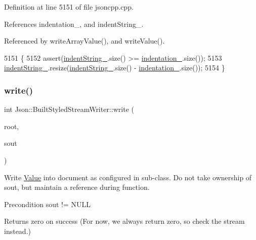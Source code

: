 Definition at line 5151 of file jsoncpp.\+cpp.



References indentation\+\_\+, and indent\+String\+\_\+.



Referenced by write\+Array\+Value(), and write\+Value().


\begin{DoxyCode}
5151                                        \{
5152   assert(\hyperlink{struct_json_1_1_built_styled_stream_writer_a0f8115a4fb474ab0e9de25f10e5ca09a}{indentString\_}.size() >= \hyperlink{struct_json_1_1_built_styled_stream_writer_aaa4cbad91428ceca37cbabfc2a17a92d}{indentation\_}.size());
5153   \hyperlink{struct_json_1_1_built_styled_stream_writer_a0f8115a4fb474ab0e9de25f10e5ca09a}{indentString\_}.resize(\hyperlink{struct_json_1_1_built_styled_stream_writer_a0f8115a4fb474ab0e9de25f10e5ca09a}{indentString\_}.size() - 
      \hyperlink{struct_json_1_1_built_styled_stream_writer_aaa4cbad91428ceca37cbabfc2a17a92d}{indentation\_}.size());
5154 \}
\end{DoxyCode}
\mbox{\label{struct_json_1_1_built_styled_stream_writer_a823cdb1afabb6b0d5f39bcd5a6a6f747}} 
\subsubsection{\texorpdfstring{write()}{write()}}
{\footnotesize\ttfamily int Json\+::\+Built\+Styled\+Stream\+Writer\+::write (\begin{DoxyParamCaption}\item[{\hyperlink{class_json_1_1_value}{Value} const \&}]{root,  }\item[{\hyperlink{json_8h_a37a25be5fca174927780caeb280094ce}{J\+S\+O\+N\+C\+P\+P\+\_\+\+O\+S\+T\+R\+E\+AM} $\ast$}]{sout }\end{DoxyParamCaption})\hspace{0.3cm}{\ttfamily [virtual]}}

Write \hyperlink{class_json_1_1_value}{Value} into document as configured in sub-\/class. Do not take ownership of sout, but maintain a reference during function. \begin{DoxyPrecond}{Precondition}
sout != N\+U\+LL 
\end{DoxyPrecond}
\begin{DoxyReturn}{Returns}
zero on success (For now, we always return zero, so check the stream instead.) 
\end{DoxyReturn}

